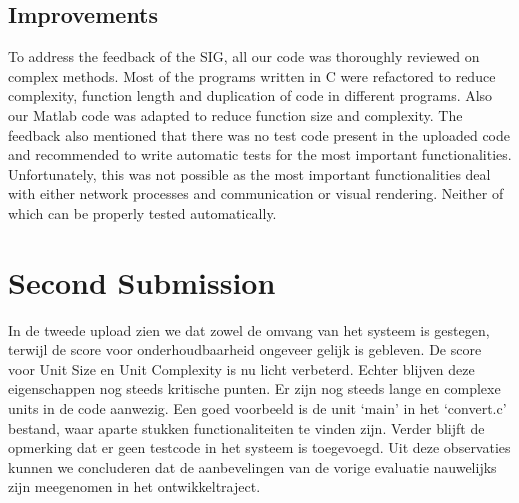 \subsection{Improvements}
To address the feedback of the SIG, all our code was thoroughly reviewed on complex methods. Most of the programs written in C were refactored to reduce complexity, function length and duplication of code in different programs. Also our Matlab code was adapted to reduce function size and complexity.
The feedback also mentioned that there was no test code present in the uploaded code and recommended to write automatic tests for the most important functionalities. Unfortunately, this was not possible as the most important functionalities deal with either network processes and communication or visual rendering. Neither of which can be properly tested automatically.

\section{Second Submission}
In de tweede upload zien we dat zowel de omvang van het systeem is gestegen, terwijl de score voor onderhoudbaarheid ongeveer gelijk is gebleven. 
De score voor Unit Size en Unit Complexity is nu licht verbeterd. Echter blijven deze eigenschappen nog steeds kritische punten. Er zijn nog steeds lange en complexe units in de code aanwezig. Een goed voorbeeld is de unit ‘main’ in het ‘convert.c’ bestand, waar aparte stukken functionaliteiten te vinden zijn. 
Verder blijft de opmerking dat er geen testcode in het systeem is toegevoegd. 
Uit deze observaties kunnen we concluderen dat de aanbevelingen van de vorige evaluatie nauwelijks zijn meegenomen in het ontwikkeltraject.